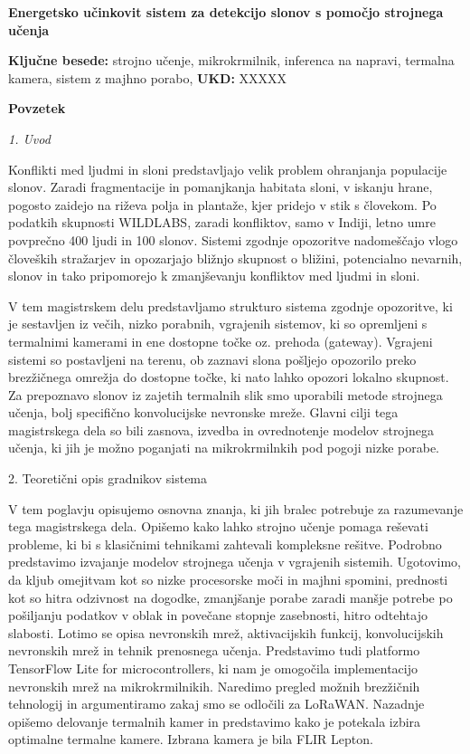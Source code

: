 \begin{poglavje}
\noindent\bfseries Energetsko učinkovit sistem za detekcijo slonov s pomočjo strojnega učenja
\end{poglavje}

\bigskip
\bigskip
\bigskip
\bigskip
\bigskip
\textbf{Ključne besede:} strojno učenje, mikrokrmilnik, inferenca na napravi, termalna kamera, sistem z majhno porabo, 
\bigskip
\textbf{UKD:} XXXXX

\bigskip
\bigskip
\bigskip
\bigskip
\bigskip
\bigskip
\textbf{Povzetek}
\newline
\newline
{\itshape
1. Uvod

Konflikti med ljudmi in sloni predstavljajo velik problem ohranjanja populacije slonov.
Zaradi fragmentacije in pomanjkanja habitata sloni, v iskanju hrane, pogosto zaidejo na riževa polja in plantaže, kjer pridejo v stik s človekom.
Po podatkih skupnosti WILDLABS, zaradi konfliktov, samo v Indiji, letno umre povprečno 400 ljudi in 100 slonov.
Sistemi zgodnje opozoritve nadomeščajo vlogo človeških stražarjev in opozarjajo bližnjo skupnost o bližini, potencialno nevarnih, slonov in tako pripomorejo k zmanjševanju konfliktov med ljudmi in sloni.

V tem magistrskem delu predstavljamo strukturo sistema zgodnje opozoritve, ki je sestavljen iz večih, nizko porabnih, vgrajenih sistemov, ki so opremljeni s termalnimi kamerami in ene dostopne točke oz. prehoda (gateway).
Vgrajeni sistemi so postavljeni na terenu, ob zaznavi slona pošljejo opozorilo preko brezžičnega omrežja do dostopne točke, ki nato lahko opozori lokalno skupnost.
Za prepoznavo slonov iz zajetih termalnih slik smo uporabili metode strojnega učenja, bolj specifično konvolucijske nevronske mreže.
Glavni cilji tega magistrskega dela so bili zasnova, izvedba in ovrednotenje modelov strojnega učenja, ki jih je možno poganjati na mikrokrmilnkih pod pogoji nizke porabe.

2. Teoretični opis gradnikov sistema

V tem poglavju opisujemo osnovna znanja, ki jih bralec potrebuje za razumevanje tega magistrskega dela.
Opišemo kako lahko strojno učenje pomaga reševati probleme, ki bi s klasičnimi tehnikami zahtevali kompleksne rešitve. 
Podrobno predstavimo izvajanje modelov strojnega učenja v vgrajenih sistemih.
Ugotovimo, da kljub omejitvam kot so nizke procesorske moči in majhni spomini, prednosti kot so hitra odzivnost na dogodke, zmanjšanje porabe zaradi manšje potrebe po pošiljanju podatkov v oblak in povečane stopnje zasebnosti, hitro odtehtajo slabosti.
Lotimo se opisa nevronskih mrež, aktivacijskih funkcij, konvolucijskih nevronskih mrež in tehnik prenosnega učenja.
Predstavimo tudi platformo TensorFlow Lite for microcontrollers, ki nam je omogočila implementacijo nevronskih mrež na mikrokrmilnikih.
Naredimo pregled možnih brezžičnih tehnologij in argumentiramo zakaj smo se odločili za LoRaWAN.
Nazadnje opišemo delovanje termalnih kamer in predstavimo kako je potekala izbira optimalne termalne kamere.
Izbrana kamera je bila FLIR Lepton.
\newline

}
